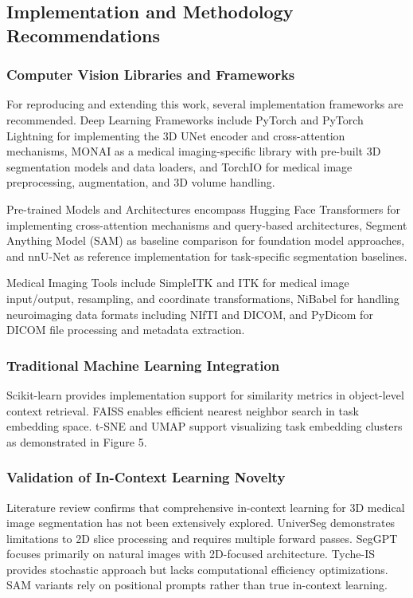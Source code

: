 \subsection{Implementation and Methodology Recommendations}
\subsubsection{Computer Vision Libraries and Frameworks}
For reproducing and extending this work, several implementation frameworks are recommended. Deep Learning Frameworks include PyTorch and PyTorch Lightning for implementing the 3D UNet encoder and cross-attention mechanisms, MONAI as a medical imaging-specific library with pre-built 3D segmentation models and data loaders, and TorchIO for medical image preprocessing, augmentation, and 3D volume handling.

Pre-trained Models and Architectures encompass Hugging Face Transformers for implementing cross-attention mechanisms and query-based architectures, Segment Anything Model (SAM) as baseline comparison for foundation model approaches, and nnU-Net as reference implementation for task-specific segmentation baselines.

Medical Imaging Tools include SimpleITK and ITK for medical image input/output, resampling, and coordinate transformations, NiBabel for handling neuroimaging data formats including NIfTI and DICOM, and PyDicom for DICOM file processing and metadata extraction.

\subsubsection{Traditional Machine Learning Integration}
Scikit-learn provides implementation support for similarity metrics in object-level context retrieval. FAISS enables efficient nearest neighbor search in task embedding space. t-SNE and UMAP support visualizing task embedding clusters as demonstrated in Figure 5.

\subsubsection{Validation of In-Context Learning Novelty}
Literature review confirms that comprehensive in-context learning for 3D medical image segmentation has not been extensively explored. UniverSeg demonstrates limitations to 2D slice processing and requires multiple forward passes. SegGPT focuses primarily on natural images with 2D-focused architecture. Tyche-IS provides stochastic approach but lacks computational efficiency optimizations. SAM variants rely on positional prompts rather than true in-context learning.

